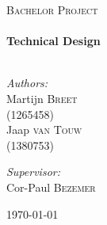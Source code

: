 \begin{titlepage}

\begin{center}



\textsc{\LARGE Bachelor Project }\\[1.5cm]


\HRule \\[0.4cm]
{ \huge \bfseries Technical Design}\\[0.4cm]

\HRule \\[1.5cm]

\begin{minipage}{0.4\textwidth}
\begin{flushleft} \large
\emph{Authors:}\\
Martijn \textsc{Breet} \\ (1265458) \\ [0.1cm]
Jaap \textsc{van Touw} \\(1380753)\\ [0.1cm]
\end{flushleft}
\end{minipage}
\begin{minipage}{0.4\textwidth}
\begin{flushright} \large
\emph{Supervisor:} \\
Cor-Paul \textsc{Bezemer}
\end{flushright}
\end{minipage}

\vfill

{\large \today}

\end{center}

\end{titlepage}
